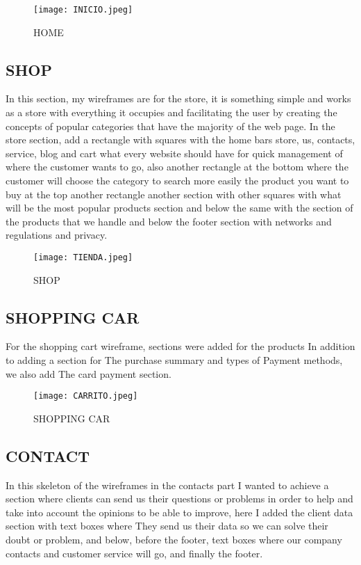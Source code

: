 \documentclass[journal]{IEEEtran}
\begin{document}
\begin{figure}[h]
    \centering
 \texttt{[image: INICIO.jpeg]}
    \caption{HOME}
    \label{fig:ejemplo}
\end{figure}

\subsection{SHOP}
In this section, my wireframes are for the store, it is something simple and works as a store with everything it occupies and facilitating the user by creating the concepts of popular categories that have the majority of the web page. In the store section, add a rectangle with squares with the home bars store, us, contacts, service, blog and cart what every website should have for quick management of where the customer wants to go, also another rectangle at the bottom where the customer will choose the category to search more easily the product you want to buy at the top another rectangle another section with other squares with what will be the most popular products section and below the same with the section of the products that we handle and below the footer section with networks and regulations and privacy.

\begin{figure}[h]
    \centering
 \texttt{[image: TIENDA.jpeg]}
    \caption{SHOP}
    \label{fig:ejemplo}
\end{figure}

\subsection{SHOPPING CAR}For the shopping cart wireframe, sections were added for the products In addition to adding a section for The purchase summary and types of Payment methods, we also add The card payment section.

\begin{figure}[h]
    \centering
 \texttt{[image: CARRITO.jpeg]}
    \caption{SHOPPING CAR }
    \label{fig:ejemplo}
\end{figure}

\subsection{CONTACT }
In this skeleton of the wireframes in the contacts part I wanted to achieve a section where clients can send us their questions or problems in order to help and take into account the opinions to be able to improve, here I added the client data section with text boxes where They send us their data so we can solve their doubt or problem, and below, before the footer, text boxes where our company contacts and customer service will go, and finally the footer.
\end{document}
